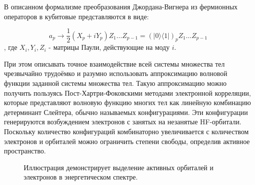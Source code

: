 \documentclass[14pt]{extarticle}
\begin{document}
\qquad В описанном формализме преобразования Джордана-Вигнера из фермионных операторов в кубитовые представляются в виде:

\begin{equation}
a_p \rightarrow \frac{1}{2}(X_{p} + iY_p)Z_1 \ldots Z_{p-1} = (| 0 \rangle \langle 1 |)_p Z_1 \ldots Z_{p-1}
\end{equation}, где $X_i, Y_i, Z_i$ - матрицы Паули, действующие на моду $i$.

\qquad При этом описывать точное взаимодействие всей системы множества тел чрезвычайно трудоёмко и разумно использовать аппроксимацию волновой функции заданной системы множества тел. Такую аппроксимацию можно получить пользуясь Пост-Хартри-Фоковскими методами электронной корреляции, \cite{Shikano_2021} которые представляют волновую функцию многих тел как линейную комбинацию детерминант Слейтера, обычно называемых конфигурациями. Эти конфигурации генерируются возбуждением электронов с занятых на незанятые HF-орбитали. Поскольку количество конфигураций комбинаторно увеличивается с количеством электронов и орбиталей можно ограничить степени свободы, определив активное пространство.

\begin{figure}[H]
\caption{Иллюстрация демонстрирует выделение активных орбиталей и электронов в энергетическом спектре.} \label{fig:active_orbitals}
\end{figure}
\end{document}
